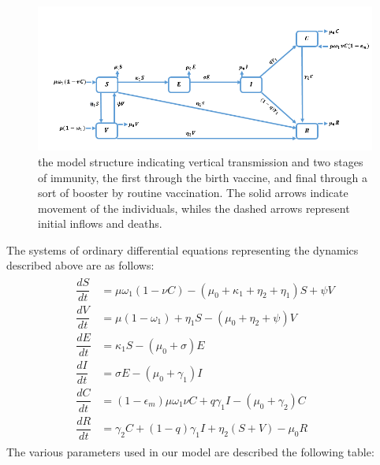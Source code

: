  		\begin{figure}[h!]
	\includegraphics[scale=0.75]{infant_vaccination_model}
 		\caption{the model structure indicating vertical transmission and two stages of immunity, the first through the birth vaccine, and final through a sort of booster by routine vaccination. The solid arrows indicate movement of the individuals, whiles the dashed arrows represent initial inflows and deaths.} \label{fig:flowchart}
	\end{figure}
	
	The systems of ordinary differential equations representing the dynamics described above are as follows:
	\begin{align}
		\begin{split}
			\dfrac{dS}{dt}&=\mu\omega_1(1-\nu C)-(\mu_0+\kappa_1+\eta_2+\eta_1)S+\psi V\\
			\dfrac{dV}{dt}&=\mu(1-\omega_1)+\eta_1S-(\mu_0+\eta_2+\psi)V \\
			\dfrac{dE}{dt}&=\kappa_1S-(\mu_0+\sigma)E \label{eqn: 1}\\
			\dfrac{dI}{dt}&=\sigma E-(\mu_0+\gamma_1)I\\
			\dfrac{dC}{dt}&=(1-\epsilon_m)\mu\omega_1\nu C+q\gamma_1I-(\mu_0+\gamma_2)C\\
			\dfrac{dR}{dt}&=\gamma_2C+(1-q)\gamma_1I+\eta_2(S+V)-\mu_0R
		\end{split}
	\end{align}
	The various parameters used in our model are described the following table:
	
